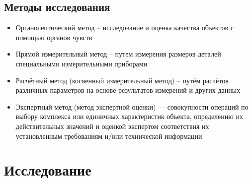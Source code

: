 \subsection{Методы исследования}
\begin{itemize}
\item  Органолептический метод – исследование и оценка качества объектов с помощью органов чувств
\item 	Прямой измерительный метод – путем измерения размеров деталей специальными измерительными приборами
\item Расчётный метод (косвенный измерительный метод) – путём расчётов различных параметров на основе результатов измерений и других данных
\item Экспертный метод (метод экспертной оценки) — совокупности операций по выбору комплекса или единичных характеристик объекта, определению их действительных значений и оценкой экспертом соответствия их установленным требованиям и/или технической информации
\end{itemize}


%
%	

% 
%
%
\section{Исследование}
%

